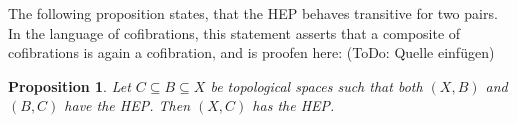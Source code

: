 \documentclass[11pt, a4paper, english]{article}
\theoremstyle{plain}
\newtheorem{proposition}[theorem]{Proposition}
\newtheorem{corollary}[theorem]{Corollary}
\theoremstyle{definition}
\theoremstyle{remark}
\numberwithin{equation}{section}
\numberwithin{theorem}{section}
\begin{document}


The following proposition states, that the HEP behaves transitive for two pairs. In the language of cofibrations, this statement asserts that a composite of cofibrations is again a cofibration, and is proofen here: (ToDo: Quelle einfügen) %

\begin{proposition} \label{prop:HEPtrans}
    Let $C \subseteq B \subseteq X$ be topological spaces such that both $(X,B)$ and $(B,C)$ have the HEP. Then $(X,C)$ has the HEP.
\end{proposition}
\end{document}
